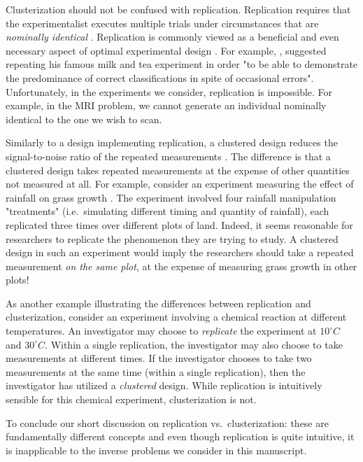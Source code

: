 Clusterization should not be confused with replication. Replication
requires that the experimentalist executes multiple trials under
circumstances that are \emph{nominally identical} \cite[Section
  1.2.4]{morris2011}. Replication is commonly viewed as a beneficial
and even necessary aspect of optimal experimental design
\cite{fisher1949design, morris2011, schafer2001replication}.
For example, \cite{fisher1949design}, suggested repeating his famous
milk and tea experiment in order "to be able to demonstrate the
predominance of correct classifications in spite of occasional
errors". Unfortunately, in the experiments we consider, replication is
impossible. For example, in the MRI problem, we cannot generate an
individual nominally identical to the one we wish to scan.

Similarly to a design implementing replication, a clustered design
reduces the signal-to-noise ratio of the repeated measurements
\cite{telford2007brief}. The difference is that a clustered design
takes repeated measurements at the expense of other quantities not
measured at all. For example, consider an experiment measuring the
effect of rainfall on grass growth \cite{fay2000rainfall}. The
experiment involved four rainfall manipulation "treatments"
(i.e.~simulating different timing and quantity of rainfall), each
replicated three times over different plots of land. Indeed, it seems
reasonable for researchers to replicate the phenomenon they are trying
to study. A clustered design in such an experiment would imply the
researchers should take a repeated measurement \emph{on the same
plot}, at the expense of measuring grass growth in other plots!

As another example illustrating the differences between replication
and clusterization, consider an experiment involving a chemical
reaction at different temperatures. An investigator may choose to
\emph{replicate} the experiment at $10^\circ C$ and $30^\circ
C$. Within a single replication, the investigator may also choose to
take measurements at different times. If the investigator chooses to
take two measurements at the same time (within a single replication),
then the investigator has utilized a \emph{clustered} design. While
replication is intuitively sensible for this chemical experiment,
clusterization is not.

To conclude our short discussion on replication vs.~clusterization:
these are fundamentally different concepts and even though replication
is quite intuitive, it is inapplicable to the inverse problems we
consider in this manuscript.

